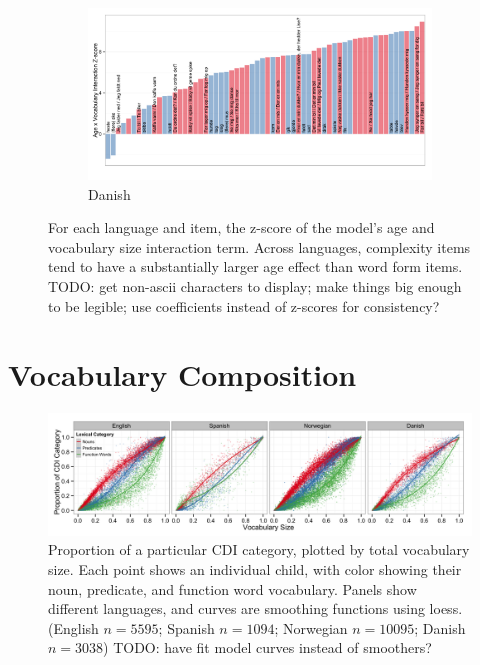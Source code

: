 \documentclass[10pt,letterpaper]{article}
\begin{document}
\begin{figure}[!tbh]
\vfill

\begin{subfigure}[b]{\linewidth}
\includegraphics[width=\textwidth]{plots/danish_interactions}
\caption{Danish}
\end{subfigure}

\captionsetup{width=\linewidth}

\caption{\label{fig:interactions} For each language and item, the z-score of the model's age and vocabulary size interaction term. Across languages, complexity items tend to have a substantially larger age effect than word form items. TODO: get non-ascii characters to display; make things big enough to be legible; use coefficients instead of z-scores for consistency?}

\end{figure}

\clearpage

\section{Vocabulary Composition}

\begin{figure}[!tbhH]
\begin{center}
\includegraphics[width=\textwidth]{plots/composition.png}
\end{center}
\caption{\label{fig:vocab_comp} Proportion of a particular CDI category, plotted by total vocabulary size. Each point shows an individual child, with color showing their noun, predicate, and function word vocabulary. Panels show different languages, and curves are smoothing functions using loess. (English $n=5595$; Spanish $n=1094$; Norwegian $n=10095$; Danish $n=3038$) TODO: have fit model curves instead of smoothers?} 
\end{figure}
\end{document}
